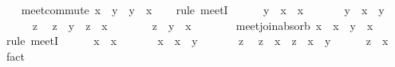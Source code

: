 \begin{isabellebody}
\isanewline
\isanewline
\ \ \isamarkupfalse%
\ meet{\isacharunderscore}commute{\isacharcolon}\ {\isachardoublequoteopen}x\ {\isasymsqinter}\ y\ {\isacharequal}\ y\ {\isasymsqinter}\ x{\isachardoublequoteclose}\isanewline
\ \ \isamarkupfalse%
\ {\isacharparenleft}rule\ meetI{\isacharparenright}\isanewline
\ \ \ \ \isamarkupfalse%
\ {\isachardoublequoteopen}y\ {\isasymsqinter}\ x\ {\isasymsqsubseteq}\ x{\isachardoublequoteclose}\ \isacommand{{\isachardot}{\isachardot}}\isamarkupfalse%
\isanewline
\ \ \ \ \isamarkupfalse%
\ {\isachardoublequoteopen}y\ {\isasymsqinter}\ x\ {\isasymsqsubseteq}\ y{\isachardoublequoteclose}\ \isacommand{{\isachardot}{\isachardot}}\isamarkupfalse%
\isanewline
\ \ \ \ \isamarkupfalse%
\ z\ \isamarkupfalse%
\ {\isachardoublequoteopen}z\ {\isasymsqsubseteq}\ y{\isachardoublequoteclose}\ \ {\isachardoublequoteopen}z\ {\isasymsqsubseteq}\ x{\isachardoublequoteclose}\isanewline
\ \ \ \ \isamarkupfalse%
\ \isamarkupfalse%
\ {\isachardoublequoteopen}z\ {\isasymsqsubseteq}\ y\ {\isasymsqinter}\ x{\isachardoublequoteclose}\ \isacommand{{\isachardot}{\isachardot}}\isamarkupfalse%
\isanewline
\ \ \isamarkupfalse%
\isanewline
\isanewline
\ \ \isamarkupfalse%
\ meet{\isacharunderscore}join{\isacharunderscore}absorb{\isacharcolon}\ {\isachardoublequoteopen}x\ {\isasymsqinter}\ {\isacharparenleft}x\ {\isasymsqunion}\ y{\isacharparenright}\ {\isacharequal}\ x{\isachardoublequoteclose}\isanewline
\ \ \isamarkupfalse%
\ {\isacharparenleft}rule\ meetI{\isacharparenright}\isanewline
\ \ \ \ \isamarkupfalse%
\ {\isachardoublequoteopen}x\ {\isasymsqsubseteq}\ x{\isachardoublequoteclose}\ \isacommand{{\isachardot}{\isachardot}}\isamarkupfalse%
\isanewline
\ \ \ \ \isamarkupfalse%
\ {\isachardoublequoteopen}x\ {\isasymsqsubseteq}\ x\ {\isasymsqunion}\ y{\isachardoublequoteclose}\ \isacommand{{\isachardot}{\isachardot}}\isamarkupfalse%
\isanewline
\ \ \ \ \isamarkupfalse%
\ z\ \isamarkupfalse%
\ {\isachardoublequoteopen}z\ {\isasymsqsubseteq}\ x{\isachardoublequoteclose}\ \ {\isachardoublequoteopen}z\ {\isasymsqsubseteq}\ x\ {\isasymsqunion}\ y{\isachardoublequoteclose}\isanewline
\ \ \ \ \isamarkupfalse%
\ {\isachardoublequoteopen}z\ {\isasymsqsubseteq}\ x{\isachardoublequoteclose}\ \isamarkupfalse%
\ fact\isanewline
\ \ \isamarkupfalse%

\end{isabellebody}
